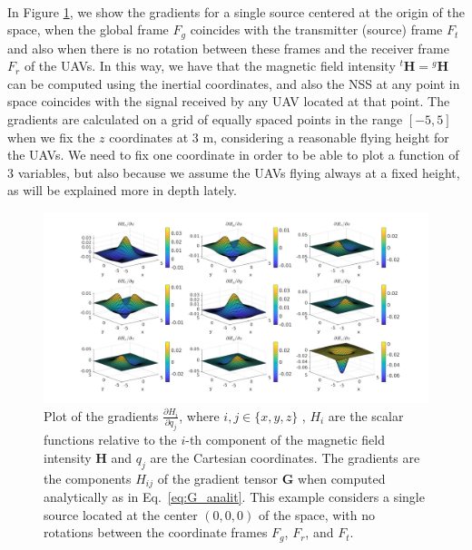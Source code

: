 \documentclass[main]{subfiles}
\begin{document}
\noindent\\
In Figure \ref{fig:gradients_single_anal}, we show the gradients for a single
source centered at the origin of the space, when the global frame 
$F_g$ coincides with the transmitter (source) frame $F_t$ and also when there 
is no rotation between these frames and the receiver frame $F_r$ of the UAVs. 
In this way, we have that the magnetic field intensity ${}^t \mathbf{H} = {}^g \mathbf{H}$
can be computed using the inertial coordinates, and also the
NSS at any point in space coincides with the signal received by 
any UAV located at that point.
The gradients are calculated on a grid of equally spaced points in the range $[-5, 5]$ when we fix the $z$ coordinates
at 3 m, considering a reasonable flying height for the UAVs.
We need to fix one coordinate in order to be able to plot 
a function of 3 variables, but also because we assume the UAVs
flying always at a fixed height, as will be explained more in 
depth lately.   
\begin{figure}
\centering
\hspace*{-0.2\textwidth} 
\includegraphics[width=1.4\textwidth]{images/gradients_single_anal.jpg}
\caption{Plot of the gradients \( \frac{\partial H_i}{\partial q_j} \), where \( i, j \in \{x, y, z\} \)
, $H_i$ are the scalar functions relative to the $i$-th component of the magnetic field 
intensity $\mathbf{H}$ and $q_j$ are the Cartesian coordinates.
The gradients are the components $H_{ij}$ of the gradient tensor \( \mathbf{G} \) when computed analytically as in Eq.~\ref{eq:G_analit}. 
This example considers a single source located at the center \((0,0,0)\) of the space, with no rotations 
between the coordinate frames \( F_g \), \( F_r \), and \( F_t \).}
\label{fig:gradients_single_anal}
\end{figure}
\end{document}
